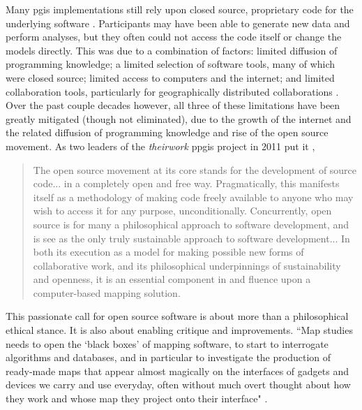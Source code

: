 \documentclass[notitlepage]{article}
\begin{document}
Many \ac{pgis} implementations still rely upon closed source, proprietary code for the underlying software \cite{heikkilaGISDeadLong1998}. Participants may have been able to generate new data and perform analyses, but they often could not access the code itself or change the models directly. This was due to a combination of factors: limited diffusion of programming knowledge; a limited selection of software tools, many of which were closed source; limited access to computers and the internet; and limited collaboration tools, particularly for geographically distributed collaborations \cite{cramptonIntroductionCriticalCartography2005}. Over the past couple decades however, all three of these limitations have been greatly mitigated (though not eliminated), due to the growth of the internet and the related diffusion of programming knowledge and rise of the open source movement. As two leaders of the \textit{theirwork} \ac{ppgis} project in 2011 put it \cite{williamsonTheirworkDevelopmentSustainable2011}, 

\blockquote{The open source movement at its core stands for the development of source code... in a completely open and free way. Pragmatically, this manifests itself as a methodology of making code freely available to anyone who may wish to access it for any purpose, unconditionally. Concurrently, open source is for many a philosophical approach to software development, and is see as the only truly sustainable approach to software development... In both its execution as a model for making possible new forms of collaborative work, and its philosophical underpinnings of sustainability and openness, it is an essential component in and fluence upon a computer-based mapping solution.}

This passionate call for open source software is about more than a philosophical ethical stance. It is also about enabling critique and improvements. ``Map studies needs to open the `black boxes' of mapping software, to start to interrogate algorithms and databases, and in particular to investigate the production of ready-made maps that appear almost magically on the interfaces of gadgets and devices we carry and use everyday, often without much overt thought about how they work and whose map they project onto their interface" \cite{dodgeMappingModesMethods2011}.
\end{document}
